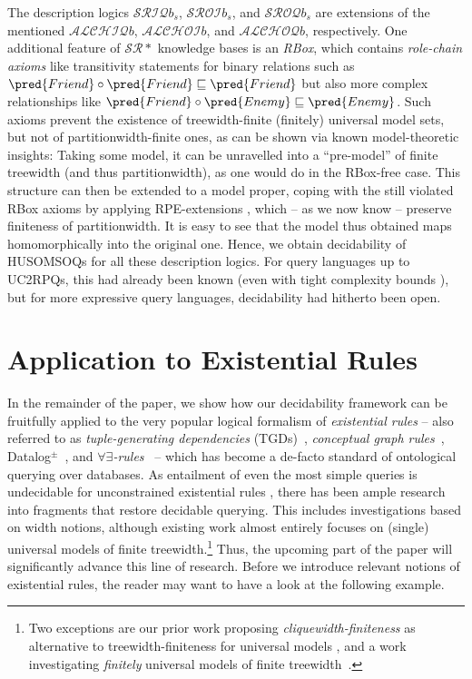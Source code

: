 \begin{example}\label{ex:srfamily}
The description logics $\mathcal{SRIQ}b_s$, $\mathcal{SROI}b_s$, and $\mathcal{SROQ}b_s$ are extensions of the mentioned $\mathcal{ALCHIQ}b$, $\mathcal{ALCHOI}b$, and $\mathcal{ALCHOQ}b$, respectively. One additional feature of $\mathcal{SR}*$ knowledge bases is an \emph{RBox}, which contains \emph{role-chain axioms} like transitivity statements for binary relations such as  $\pred{Friend}\circ\pred{Friend} \sqsubseteq \pred{Friend}$ but also more complex relationships like $\pred{Friend}\circ\pred{Enemy} \sqsubseteq \pred{Enemy}$. Such axioms prevent the existence of treewidth-finite (finitely) universal model sets, but not of partitionwidth-finite ones, as can be shown via known model-theoretic insights: Taking some model, it can be unravelled into a ``pre-model'' of finite treewidth (and thus partitionwidth), as one would do in the RBox-free case. This structure can then be extended to a model proper, coping with the still violated RBox axioms by applying RPE-extensions \cite{Kazakov08,CalvaneseEO09}, which -- as we now know -- preserve finiteness of partitionwidth. It is easy to see that the model thus obtained maps homomorphically into the original one. Hence, we obtain decidability of HUSOMSOQs for all these description logics. For query languages up to UC2RPQs, this had already been known (even with tight complexity bounds \cite{CalvaneseEO09,BednarczykR19}), but for more expressive query languages, decidability had hitherto been open.
\end{example}


\section{Application to Existential Rules}\label{sec:rules}
In the remainder of the paper, we show how our decidability framework can be fruitfully applied to the very popular logical formalism of \emph{existential rules} -- also referred to as \emph{tuple-generating dependencies} (TGDs)~\cite{AbiteboulHV95}, \emph{conceptual graph rules}~\cite{SalMug96}, Datalog$^\pm$~\cite{Gottlob09}, and \emph{$\forall \exists$-rules}~\cite{BagLecMugSal11} -- which has become a de-facto standard of ontological querying over databases. As entailment of even the most simple queries is undecidable for unconstrained existential rules \cite{ChandraLM81}, there has been ample research into fragments that restore decidable querying. This includes investigations based on width notions, although existing work almost entirely focuses on (single) universal models of finite treewidth.\footnote{Two exceptions are our prior work proposing \emph{cliquewidth-finiteness} as alternative to tree\-width-finite\-ness for universal models \cite{ICDT2023}, and a work investigating \emph{finitely} universal models of finite treewidth~\cite{BMR2023}.} Thus, the upcoming part of the paper will significantly advance this line of research. Before we introduce relevant notions of existential rules, the reader may want to have a look at the following example.

